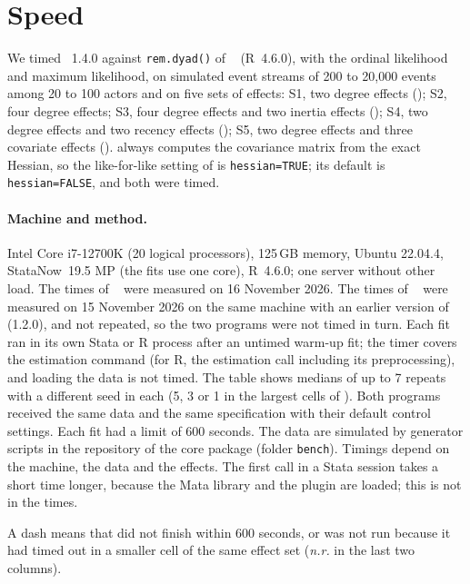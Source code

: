 \section{Speed}\label{sec:speed}

We timed \nwrem{}~1.4.0 against \texttt{rem.dyad()} of \relevent{}~\releventver{} (R~4.6.0), with the ordinal likelihood and maximum likelihood, on simulated event streams of 200 to 20,000 events among 20 to 100 actors and on five sets of effects: S1, two degree effects (); S2, four degree effects; S3, four degree effects and two inertia effects (); S4, two degree effects and two recency effects (); S5, two degree effects and three covariate effects (). \nwrem{} always computes the covariance matrix from the exact Hessian, so the like-for-like setting of \relevent{} is \texttt{hessian=TRUE}; its default is \texttt{hessian=FALSE}, and both were timed.

\paragraph{Machine and method.} Intel Core i7-12700K (20 logical processors), 125\,GB memory, Ubuntu 22.04.4, StataNow~19.5 MP (the fits use one core), R~4.6.0; one server without other load. The times of \nwrem{}~\pkgversion{} were measured on 16 November 2026. The times of \relevent{}~\releventver{} were measured on 15 November 2026 on the same machine with an earlier version of \nwrem{} (1.2.0), and not repeated, so the two programs were not timed in turn. Each fit ran in its own Stata or R process after an untimed warm-up fit; the timer covers the estimation command (for R, the estimation call including its preprocessing), and loading the data is not timed. The table shows medians of up to 7 repeats with a different seed in each (5, 3 or 1 in the largest cells of \relevent{}). Both programs received the same data and the same specification with their default control settings. Each fit had a limit of 600 seconds. The data are simulated by generator scripts in the repository of the core package (folder \texttt{bench}). Timings depend on the machine, the data and the effects. The first call in a Stata session takes a short time longer, because the Mata library and the plugin are loaded; this is not in the times.

{\footnotesize}
\noindent A dash means that \relevent{} did not finish within 600 seconds, or was not run because it had timed out in a smaller cell of the same effect set (\emph{n.r.} in the last two columns).

